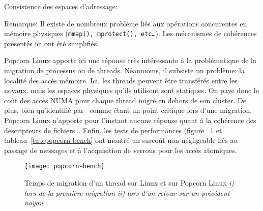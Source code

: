 \begin{paragraph}{Consistence des espaces d'adressage:}
        \begin{paragraph}{Remarque:}
          Il existe de nombreux problème liés aux opérations concurentes en
          mémoire physiques (\texttt{mmap(), mprotect(), etc\ldots}). Les
          mécanismes de cohérences présentés ici ont été simplifiés.\\
        \end{paragraph}

      \end{paragraph}

      Popcorn Linux apporte ici une réponse très intéressante à la problématique
      de la migration de processus ou de threads. Néanmoins, il subsiste un
      problème: la localité des accès mémoire. Ici, les threads peuvent être
      transférés entre les noyaux, mais les espaces physiques qu'ils utilisent
      sont statiques. On paye donc le coût des accès NUMA pour chaque thread
      migré en dehors de son cluster. De plus, bien qu'identifié
      par~\citeauthor{katz2013popcorn} comme étant un point critique lors d'une
      migration, Popcorn Linux n'apporte pour l'instant aucune réponse quant à
      la cohérence des descripteurs de fichiers~\citep[page
        4]{katz2013popcorn}. Enfin, les tests de performances (figure
      ~\ref{fig:popcorn-bench} et tableau~\ref{tab:popcorn-bench} ont montré un
      surcoût non négligeable liés au passage de messages et à l'acquisition de
      verrous pour les accès atomiques.

      \begin{figure}[ht]
        \centering \texttt{[image: popcorn-bench]}
        \caption{Temps de migration d'un thread sur Linux et sur Popcorn Linux
          \itshape i) \upshape lors de la première migration \itshape ii)
          \upshape lors d'un retour sur un précédent
          noyau~\citep{katz2013popcorn}.}
        \label{fig:popcorn-bench}
      \end{figure}


